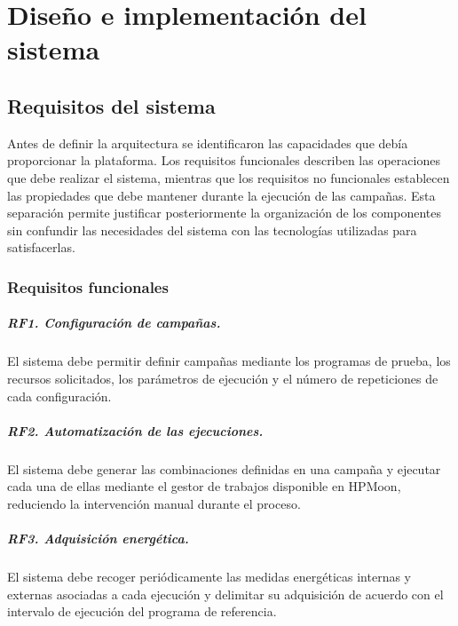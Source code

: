 \chapter{Diseño e implementación del sistema}
\label{chap:implementacion}

\section{Requisitos del sistema}
\label{sec:requisitos-sistema}

Antes de definir la arquitectura se identificaron las capacidades que debía proporcionar la plataforma. Los requisitos funcionales describen las operaciones que debe realizar el sistema, mientras que los requisitos no funcionales establecen las propiedades que debe mantener durante la ejecución de las campañas. Esta separación permite justificar posteriormente la organización de los componentes sin confundir las necesidades del sistema con las tecnologías utilizadas para satisfacerlas.

\subsection{Requisitos funcionales}

\paragraph{RF1. Configuración de campañas.}
El sistema debe permitir definir campañas mediante los programas de prueba, los recursos solicitados, los parámetros de ejecución y el número de repeticiones de cada configuración.

\paragraph{RF2. Automatización de las ejecuciones.}
El sistema debe generar las combinaciones definidas en una campaña y ejecutar cada una de ellas mediante el gestor de trabajos disponible en HPMoon, reduciendo la intervención manual durante el proceso.

\paragraph{RF3. Adquisición energética.}
El sistema debe recoger periódicamente las medidas energéticas internas y externas asociadas a cada ejecución y delimitar su adquisición de acuerdo con el intervalo de ejecución del programa de referencia.

